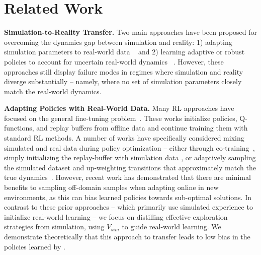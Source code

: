 \section{Related Work}
\label{sec:related}
\noindent\textbf{Simulation-to-Reality Transfer.} Two main approaches have been proposed for overcoming the dynamics gap between simulation and reality:  1) adapting simulation parameters to real-world data ~\citep{chebotar19close, ramos19bayessim, memmel24asid} and 2) learning adaptive or robust policies to account for uncertain real-world dynamics ~\citep{haozhirma, rma, yu17prep}. However, these approaches still display failure modes in regimes where simulation and reality diverge substantially \cite{smith2022walk} -- namely, where no set of simulation parameters closely match the real-world dynamics. 


\noindent\textbf{Adapting Policies with Real-World Data.} 
Many RL approaches have focused on the general fine-tuning problem~\citep{Rajeswaran-RSS-18, nair2020awac, kostrikov2021offline, hu2023imitation, nakamoto2024cal}. These works initialize policies, Q-functions, and replay buffers from offline data and continue training them with standard RL methods. A number of works have specifically considered mixing simulated and real data during policy optimization -- either through co-training~\citep{torne24rialto}, simply initializing the replay-buffer with simulation data \citep{smith2022walk, ball2023efficient}, or adaptively sampling the simulated dataset and up-weighting transitions that approximately match the true dynamics~\citep{eysenbach2020off, liu2022dara, xu2023cross, niu2022trust}. However, recent work \cite{zhou2024efficient} has demonstrated that there are minimal benefits to sampling off-domain samples when adapting online in new environments, as this can bias learned policies towards sub-optimal solutions. In contrast to these prior approaches -- which primarily use simulated experience to initialize real-world learning -- we focus on distilling effective exploration strategies from simulation, using $V_{sim}$ to guide real-world learning. We demonstrate theoretically that this approach to transfer leads to low bias in the policies learned by \Method. 
